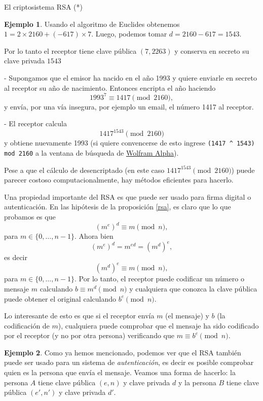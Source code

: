 \documentclass[11pt,spanish,makeidx]{amsbook}
\theoremstyle{definition}
\newtheorem{ejemplo}{Ejemplo}[section]
\theoremstyle{remark}
\begin{document}
\begin{section}{El criptosistema RSA (*)}
\begin{ejemplo}
Usando el algoritmo de Euclides obtenemos $1 = 2\times 2160 + (-617)\times 7$. Luego, podemos tomar $d = 2160 -617 =1543$. 

Por lo tanto el receptor tiene clave pública $(7,2263)$ y conserva en secreto  su clave privada $1543$

- Supongamos que el emisor ha nacido en el año 1993 y quiere enviarle en secreto al receptor su año de nacimiento. Entonces encripta el año haciendo 
$$
1993^7 \equiv 1417 \pmod{2160},
$$   
y envía, por una vía insegura, por ejemplo un email, el número 1417 al receptor.

- El receptor calcula
$$
1417^{1543} \pmod{2160}
$$ 
y obtiene nuevamente 1993 (si quiere convencerse de esto ingrese {\tt (1417 \^{} 1543) mod 2160} a la ventana de búsqueda de \href{https://www.wolframalpha.com}{Wolfram Alpha}).

Pese a que el cálculo de desencriptado (en este caso $1417^{1543} \pmod{2160}$) puede parecer costoso computacionalmente, hay métodos eficientes para hacerlo. 

\end{ejemplo}

Una propiedad importante del RSA es que puede ser usado para firma digital o autenticación. En las hipótesis de la proposición \ref{rsa}, es claro que lo que probamos es que 
$$
(m^e)^d \equiv m \pmod{n},
$$
para $m \in \{0,\ldots,n-1\}$. Ahora bien 
$$
(m^e)^d  = m^{ed} = (m^d)^e,  
$$
es decir
$$
(m^d)^e \equiv m \pmod{n}, 
$$
para $m \in \{0,\ldots,n-1\}$. Por lo tanto, el receptor puede codificar un número o mensaje $m$ calculando  $b \equiv m^d  \pmod{n}$ y cualquiera que conozca la clave pública puede obtener el original calculando $b^e \pmod{n}$. 

Lo interesante de esto es que si el receptor envía $m$ (el mensaje) y $b$ (la codificación de $m$), cualquiera puede comprobar que el mensaje ha sido codificado por el receptor (y no por otra persona) verificando  que   $m \equiv b^e \pmod{n}$.     

\begin{ejemplo}
Como ya hemos mencionado, podemos ver que el RSA también puede ser usado para un sistema de \emph{autenticación}, es decir es posible comprobar quien es la persona que envía el mensaje. Veamos una forma de hacerlo: la persona $A$ tiene clave pública $(e,n)$ y clave privada $d$ y   la persona $B$  tiene clave pública $(e',n')$ y clave privada $d'$. 


\end{ejemplo}
\end{section}
\end{document}
